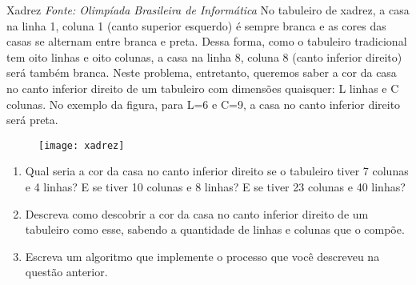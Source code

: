 \begin{task}{Xadrez}
\textit{Fonte: Olimpíada Brasileira de Informática}
No tabuleiro de xadrez, a casa na linha 1, coluna 1 (canto superior esquerdo) é sempre branca e as cores das casas se alternam entre branca e preta. Dessa forma, como o tabuleiro tradicional tem oito linhas e oito colunas, a casa na linha 8, coluna 8 (canto inferior direito) será também branca. Neste problema, entretanto, queremos saber a cor da casa no canto inferior direito de um tabuleiro com dimensões quaisquer: L linhas e C colunas. No exemplo da figura, para L=6 e C=9, a casa no canto inferior direito será preta.

\begin{figure}[H]
\centering

\texttt{[image: xadrez]}
\end{figure}

\begin{enumerate}
\item Qual seria a cor da casa no canto inferior direito se o tabuleiro tiver 7 colunas e 4 linhas? E se tiver 10 colunas e 8 linhas? E se tiver 23 colunas e 40 linhas?

\item Descreva como descobrir a cor da casa no canto inferior direito de um tabuleiro como esse, sabendo a quantidade de linhas e colunas que o compõe.

\item Escreva um algoritmo que implemente o processo que você descreveu na questão anterior.
\end{enumerate}
\end{task}


